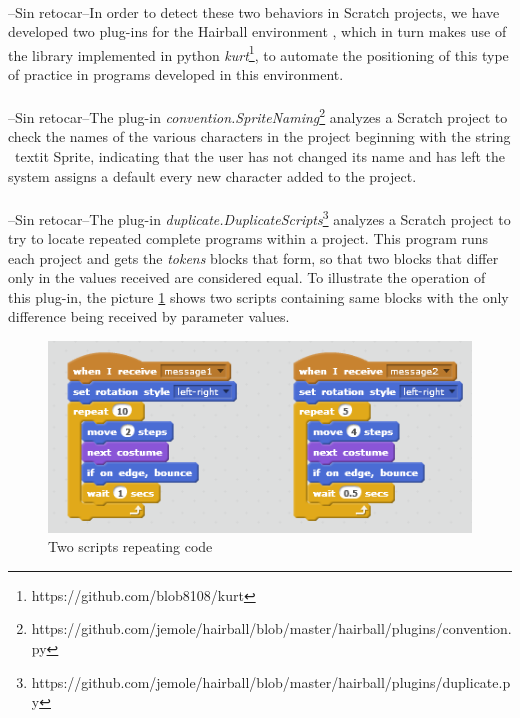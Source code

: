 \documentclass[a4paper,10pt]{article}
\begin{document}
\paragraph{} --Sin retocar--In order to detect these two behaviors in Scratch projects, we have developed two plug-ins for the Hairball environment \cite{boe2013hairball}, which in turn makes use of the library implemented in python \textit{kurt}\footnote{https://github.com/blob8108/kurt}, to automate the positioning of this type of practice in programs developed in this environment.
\paragraph{}--Sin retocar--The plug-in \textit{convention.SpriteNaming}\footnote{https://github.com/jemole/hairball/blob/master/hairball/plugins/convention.py} analyzes a Scratch project to check the names of the various characters in the project beginning with the string \ textit {Sprite}, indicating that the user has not changed its name and has left the system assigns a default every new character added to the project.
\paragraph{}--Sin retocar--The plug-in \textit{duplicate.DuplicateScripts}\footnote{https://github.com/jemole/hairball/blob/master/hairball/plugins/duplicate.py} analyzes a Scratch project to try to locate repeated complete programs within a project. This program runs each project and gets the \textit{tokens} blocks that form, so that two blocks that differ only in the values received are considered equal. To illustrate the operation of this plug-in, the picture \ref{fig:CodeRepetition1} shows two scripts containing same blocks with the only difference being received by parameter values.
\begin{figure}
  \centering
    \includegraphics{img/CodeRepetition1.png}
  \caption{Two scripts repeating code}
  \label{fig:CodeRepetition1}
\end{figure}
\end{document}
